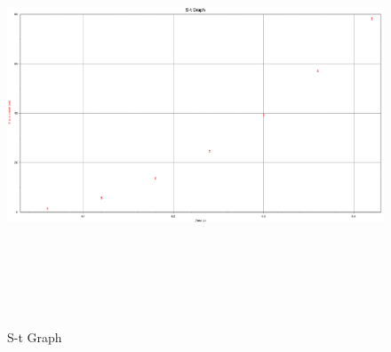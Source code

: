 \documentclass[12pt,a4paper]{article}
\begin{document}
\begin{figure}[H]
    \includegraphics[width = 16cm, height = 12.5cm]{S-t.png}
    \caption{S-t Graph}
\end{figure}
\end{document}
